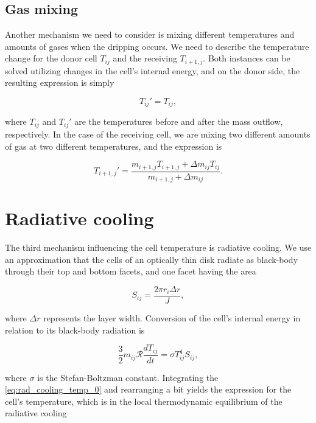 \subsection{Gas mixing}
    Another mechanism we need to consider is mixing different temperatures and amounts of gases when the dripping occurs. We need to describe the temperature change for the donor cell $T_{ij}$ and the receiving $T_{i+1,j}$. Both instances can be solved utilizing changes in the cell's internal energy, and on the donor side, the resulting expression is simply  

    \begin{equation}
    T_{ij}' = T_{ij},
    \end{equation}

    where $T_{ij}$ and $T_{ij}'$ are the temperatures before and after the mass outflow, respectively. In the case of the receiving cell, we are mixing two different amounts of gas at two different temperatures, and the expression is

    \begin{equation}
    T_{i+1,j}' = \frac{m_{i+1,j} T_{i+1,j} + \Delta m_{ij} T_{ij}}{m_{i+1,j} + \Delta m_{ij}}.
    \end{equation}

\section{Radiative cooling}
    The third mechanism influencing the cell temperature is radiative cooling. We use an approximation that the cells of an optically thin disk radiate as black-body through their top and bottom facets, and one facet having the area

    \begin{equation}
        S_{ij} = \frac{2 \pi r_i \Delta r}{J},
        \label{eq:facet_area}
    \end{equation}

    where $\Delta r$ represents the layer width. Conversion of the cell's internal energy in relation to its black-body radiation is

    \begin{equation}
        \frac{3}{2} m_{ij} \mathcal{R} \frac{dT_{ij}}{dt} = \sigma T_{ij}^4 S_{ij},
        \label{eq:rad_cooling_temp_0}
    \end{equation}

    where $\sigma$ is the Stefan-Boltzman constant. Integrating the \eqref{eq:rad_cooling_temp_0} and rearranging a bit yields the expression for the cell's temperature, which is in the local thermodynamic equilibrium of the radiative cooling

